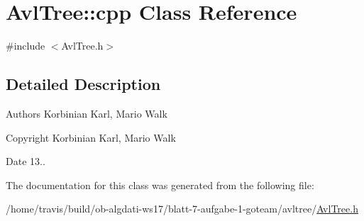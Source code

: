 \hypertarget{classAvlTree_1_1cpp}{\section{Avl\-Tree\-:\-:cpp Class Reference}
\label{classAvlTree_1_1cpp}
}


{\ttfamily \#include $<$Avl\-Tree.\-h$>$}



\subsection{Detailed Description}
\begin{DoxyAuthor}{Authors}
Korbinian Karl, Mario Walk 
\end{DoxyAuthor}
\begin{DoxyCopyright}{Copyright}
Korbinian Karl, Mario Walk 
\end{DoxyCopyright}
\begin{DoxyDate}{Date}
13.. 
\end{DoxyDate}


The documentation for this class was generated from the following file\-:\begin{DoxyCompactItemize}
\item 
/home/travis/build/ob-\/algdati-\/ws17/blatt-\/7-\/aufgabe-\/1-\/goteam/avltree/\hyperlink{AvlTree_8h}{Avl\-Tree.\-h}\end{DoxyCompactItemize}
